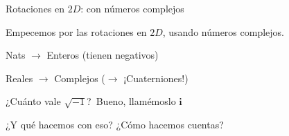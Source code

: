 \documentclass[10pt]{beamer}
\def\R{\mathbb{R}}
\def\ii{\textbf{i}}
\begin{document}
\begin{frame}{Rotaciones en $2D$: con números complejos}



Empecemos por las rotaciones en $2D$, usando números complejos. \bigskip



\small{Nats $\rightarrow$ Enteros (tienen negativos)}

Reales $\rightarrow$ Complejos ($\rightarrow$ ¡Cuaterniones!)  \bigskip

¿Cuánto vale $\sqrt{-1}$?\ Bueno, llamémoslo $\ii$ 


¿Y qué hacemos con eso? ¿Cómo hacemos cuentas?









\end{frame}
\end{document}
